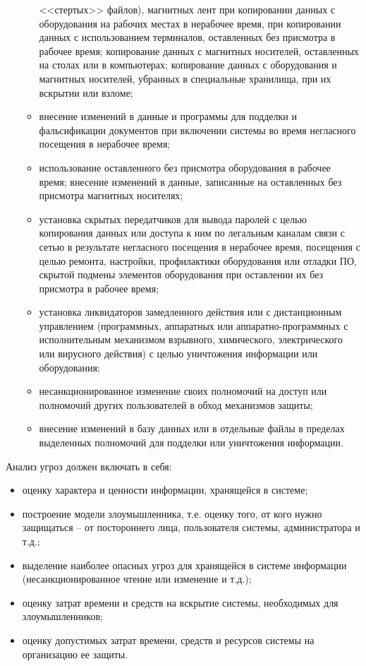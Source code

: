 \begin{enumerate}
\begin{itemize}
	<<стертых>> файлов), магнитных лент при копировании данных с оборудования на
	рабочих местах в нерабочее время, при копировании данных с использованием
	терминалов, оставленных без присмотра в рабочее время; копирование данных с
	магнитных носителей, оставленных на столах или в компьютерах; копирование
	данных с оборудования и магнитных носителей, убранных в специальные хранилища,
	при их вскрытии или взломе;
	\item внесение изменений в данные и программы для подделки и фальсификации
	документов при включении системы во время негласного посещения в нерабочее время; 
	\item использование оставленного без присмотра оборудования в рабочее время;
	внесение изменений в данные, записанные на оставленных без присмотра магнитных носителях; 
	\item установка скрытых передатчиков для вывода паролей с целью копирования
	данных или доступа к ним по легальным каналам связи с сетью в результате
	негласного посещения в нерабочее время, посещения с целью ремонта, настройки,
	профилактики оборудования или отладки ПО, скрытой подмены элементов
	оборудования при оставлении их без присмотра в рабочее время;
	\item установка ликвидаторов замедленного действия или с дистанционным
	управлением (программных, аппаратных или аппаратно-программных с исполнительным
	механизмом взрывного, химического, электрического или вирусного действия) с
	целью уничтожения информации или оборудования; 
	\item несанкционированное изменение
	своих полномочий на доступ или полномочий других пользователей в обход
	механизмов защиты;
	\item внесение изменений в базу данных или в отдельные файлы в пределах
	выделенных полномочий для подделки или уничтожения информации.
  \end{itemize}
\end{enumerate}

Анализ угроз должен включать в себя:
\begin{itemize}
  \item оценку характера и ценности информации, хранящейся в системе;
  \item построение модели злоумышленника, т.е. оценку того, от кого нужно
  защищаться -- от постороннего лица, пользователя системы, администратора и
  т.д.;
  \item выделение наиболее опасных угроз для хранящейся в системе информации
(несанкционированное чтение или изменение и т.д.); 
  \item оценку затрат времени и средств на вскрытие системы, необходимых для
злоумышленников; 
  \item оценку допустимых затрат времени, средств и ресурсов системы на
организацию ее защиты.
\end{itemize}

